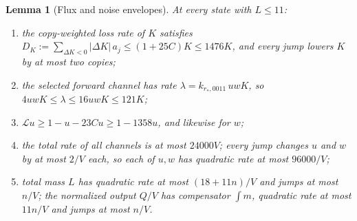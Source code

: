 \documentclass[11pt,letterpaper]{article}
\theoremstyle{plain}
\newtheorem{lemma}[theorem]{Lemma}
\theoremstyle{definition}
\theoremstyle{remark}
\numberwithin{equation}{section}
\newcommand{\cL}{\mathcal L}
\begin{document}
\begin{lemma}[Flux and noise envelopes]\label{lem:flux}
At every state with $L\le11$:
\begin{enumerate}[label=(E\arabic*),leftmargin=3em]
\item the copy-weighted loss rate of $K$ satisfies $D_K:=\sum_{\Delta K<0}|\Delta K|\,a_j\le(1+25C)K\le1476K$, and every jump lowers $K$ by at most two copies;
\item the selected forward channel has rate $\lambda=k_{r_*,0011}\,uwK$, so $4uwK\le\lambda\le16uwK\le121K$;
\item $\cL u\ge1-u-23Cu\ge1-1358u$, and likewise for $w$;
\item the total rate of all channels is at most $24000V$; every jump changes $u$ and $w$ by at most $2/V$ each, so each of $u,w$ has quadratic rate at most $96000/V$;
\item total mass $L$ has quadratic rate at most $(18+11n)/V$ and jumps at most $n/V$; the normalized output $Q/V$ has compensator $\int m$, quadratic rate at most $11n/V$ and jumps at most $n/V$.
\end{enumerate}
\end{lemma}
\end{document}
